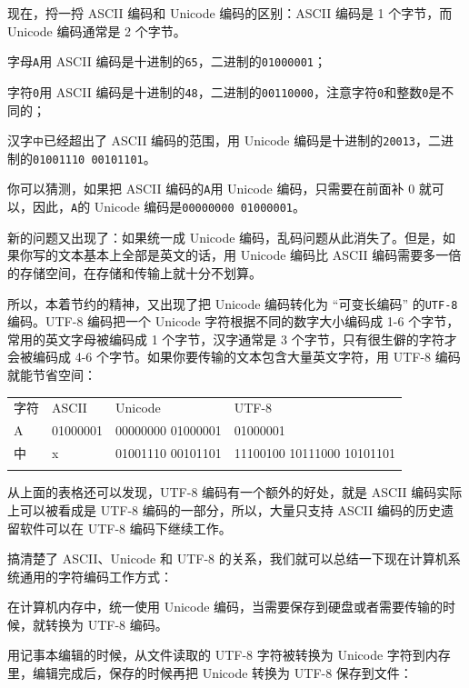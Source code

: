 现在，捋一捋 ASCII 编码和 Unicode 编码的区别：ASCII 编码是 1 个字节，而
Unicode 编码通常是 2 个字节。

字母\texttt{A}用 ASCII
编码是十进制的\texttt{65}，二进制的\texttt{01000001}；

字符\texttt{0}用 ASCII
编码是十进制的\texttt{48}，二进制的\texttt{00110000}，注意字符\texttt{\textquotesingle{}0\textquotesingle{}}和整数\texttt{0}是不同的；

汉字\texttt{中}已经超出了 ASCII 编码的范围，用 Unicode
编码是十进制的\texttt{20013}，二进制的\texttt{01001110\ 00101101}。

你可以猜测，如果把 ASCII 编码的\texttt{A}用 Unicode 编码，只需要在前面补
0 就可以，因此，\texttt{A}的 Unicode 编码是\texttt{00000000\ 01000001}。

新的问题又出现了：如果统一成 Unicode
编码，乱码问题从此消失了。但是，如果你写的文本基本上全部是英文的话，用
Unicode 编码比 ASCII
编码需要多一倍的存储空间，在存储和传输上就十分不划算。

所以，本着节约的精神，又出现了把 Unicode 编码转化为 ``可变长编码''
的\texttt{UTF-8}编码。UTF-8 编码把一个 Unicode
字符根据不同的数字大小编码成 1-6 个字节，常用的英文字母被编码成 1
个字节，汉字通常是 3 个字节，只有很生僻的字符才会被编码成 4-6
个字节。如果你要传输的文本包含大量英文字符，用 UTF-8 编码就能节省空间：

\begin{longtable}[]{@{}llll@{}}
\toprule
字符 & ASCII & Unicode & UTF-8 \\ \addlinespace
\midrule
\endhead
A & 01000001 & 00000000 01000001 & 01000001 \\ \addlinespace
中 & x & 01001110 00101101 & 11100100 10111000 10101101 \\ \addlinespace
\bottomrule
\end{longtable}

从上面的表格还可以发现，UTF-8 编码有一个额外的好处，就是 ASCII
编码实际上可以被看成是 UTF-8 编码的一部分，所以，大量只支持 ASCII
编码的历史遗留软件可以在 UTF-8 编码下继续工作。

搞清楚了 ASCII、Unicode 和 UTF-8
的关系，我们就可以总结一下现在计算机系统通用的字符编码工作方式：

在计算机内存中，统一使用 Unicode
编码，当需要保存到硬盘或者需要传输的时候，就转换为 UTF-8 编码。

用记事本编辑的时候，从文件读取的 UTF-8 字符被转换为 Unicode
字符到内存里，编辑完成后，保存的时候再把 Unicode 转换为 UTF-8
保存到文件：

